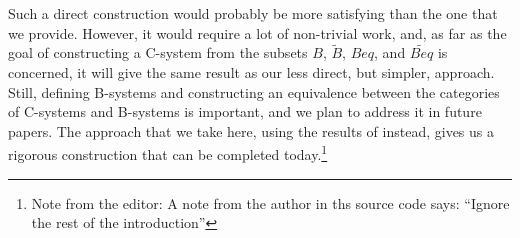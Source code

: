 \documentclass[onecolumn,12pt]{amsart}
\numberwithin{proposition}{subsection}
\newcommand{\wt}{\widetilde}
\newcommand{\RR}{{\bf RR}}
\newcommand{\LM}{{\bf LM}}
\newcommand{\editorfootnote}[1]{\footnote{Note from the editor: #1}}
\begin{document}
Such a direct construction would probably be more satisfying than the one that
we provide. However, it would require a lot of non-trivial work, and, as far as
the goal of constructing a C-system from the subsets $B$, $\wt{B}$, $Beq$, and
$\wt{Beq}$ is concerned, it will give the same result as our less direct, but simpler,
approach. Still, defining B-systems and constructing an equivalence between the
categories of C-systems and B-systems is important, and we plan to address it in
future papers. The approach that we take here, using the results of
\cite{Csubsystems} instead, gives us a rigorous construction that can be
completed today.\editorfootnote{A note from the author in ths source code says: ``Ignore the rest of the introduction''}






\end{document}
